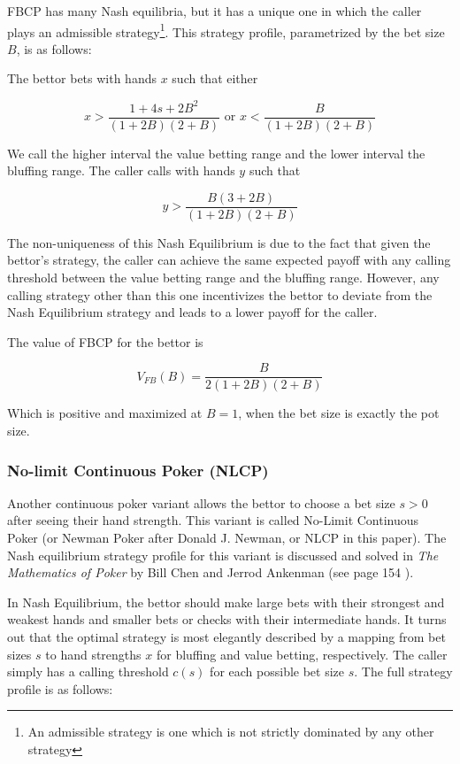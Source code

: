 \documentclass[a4paper,12pt]{article}
\theoremstyle{plain}
\theoremstyle{definition}
\begin{document}
FBCP has many Nash equilibria, but it has a unique one in which the caller plays an admissible strategy\footnote{An admissible strategy is one which is not strictly dominated by any other strategy}. This strategy profile, parametrized by the bet size $B$, is as follows:

The bettor bets with hands $x$ such that either 

$$x > \frac{1 + 4s + 2B^2}{(1+2B)(2+B)} \text{ or } x < \frac{B}{(1+2B)(2+B)}$$

We call the higher interval the value betting range and the lower interval the bluffing range. The caller calls with hands $y$ such that

$$ y > \frac{B(3 +2B)}{(1+2B)(2+B)} $$

The non-uniqueness of this Nash Equilibrium is due to the fact that given the bettor's strategy, the caller can achieve the same expected payoff with any calling threshold between the value betting range and the bluffing range. However, any calling strategy other than this one incentivizes the bettor to deviate from the Nash Equilibrium strategy and leads to a lower payoff for the caller. 

The value of FBCP for the bettor is 

$$ V_{FB}(B) = \frac{B}{2(1+2B)(2+B)} $$

Which is positive and maximized at $B = 1$, when the bet size is exactly the pot size. 

\subsubsection{No-limit Continuous Poker (NLCP)}
Another continuous poker variant allows the bettor to choose a bet size $s > 0$ after seeing their hand strength. This variant is called No-Limit Continuous Poker (or Newman Poker after Donald J. Newman, or NLCP in this paper). The Nash equilibrium strategy profile for this variant is discussed and solved in \textit{The Mathematics of Poker} by Bill Chen and Jerrod Ankenman (see page 154 ). 

In Nash Equilibrium, the bettor should make large bets with their strongest and weakest hands and smaller bets or checks with their intermediate hands. It turns out that the optimal strategy is most elegantly described by a mapping from bet sizes $s$ to hand strengths $x$ for bluffing and value betting, respectively. The caller simply has a calling threshold $c(s)$ for each possible bet size $s$. The full strategy profile is as follows:
\end{document}
